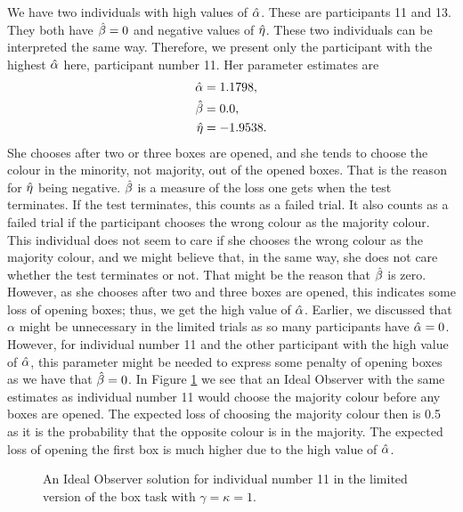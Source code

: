 We have two individuals with high values of $\hat{\alpha}$. These are participants 11 and 13. They both have $\hat{\beta}=0$ and negative values of $\hat{\eta}$. These two individuals can be interpreted the same way. Therefore, we present only the participant with the highest $\hat{\alpha}$ here, participant number 11. Her parameter estimates are
\begin{equation}
\label{mles_lim_person11}
    \begin{aligned}
        \hat{\alpha} &= 1.1798,\\
        \hat{\beta} &= 0.0,\\
        \hat{\eta} &= -1.9538.
    \end{aligned}
\end{equation}
She chooses after two or three boxes are opened, and she tends to choose the colour in the minority, not majority, out of the opened boxes. That is the reason for $\hat{\eta}$ being negative. $\hat{\beta}$ is a measure of the loss one gets when the test terminates. If the test terminates, this counts as a failed trial. It also counts as a failed trial if the participant chooses the wrong colour as the majority colour. This individual does not seem to care if she chooses the wrong colour as the majority colour, and we might believe that, in the same way, she does not care whether the test terminates or not. That might be the reason that $\hat{\beta}$ is zero. However, as she chooses after two and three boxes are opened, this indicates some loss of opening boxes; thus, we get the high value of $\hat{\alpha}$. 
Earlier, we discussed that $\alpha$ might be unnecessary in the limited trials as so many participants have $\hat{\alpha}=0$. However, for individual number 11 and the other participant with the high value of $\hat{\alpha}$, this parameter might be needed to express some penalty of opening boxes as we have that $\hat{\beta}=0$.
In Figure \ref{fig:IO_sol_person11_limited_gk1} we see that an Ideal Observer with the same estimates as individual number 11 would choose the majority colour before any boxes are opened. The expected loss of choosing the majority colour then is 0.5 as it is the probability that the opposite colour is in the majority. The expected loss of opening the first box is much higher due to the high value of $\hat{\alpha}$. 
\begin{figure}
    \centering
    \scalebox{0.7}{}
    \caption[Ideal Observer solution individual 11, limited. $\gamma=\kappa=1$]{An Ideal Observer solution for individual number 11 in the limited version of the box task with $\gamma=\kappa=1$.}
    \label{fig:IO_sol_person11_limited_gk1}
\end{figure}


